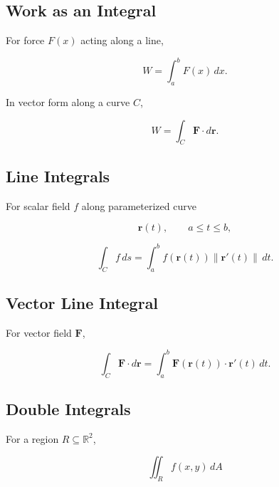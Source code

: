 \subsection{Work as an Integral}
\label{subsec:work-integral-reference}

For force \(F(x)\) acting along a line,

\[
\boxed{
W
=
\int_a^b
F(x)\,dx.
}
\]

In vector form along a curve \(C\),

\[
\boxed{
W
=
\int_C
\mathbf{F}\cdot d\mathbf{r}.
}
\]

\subsection{Line Integrals}
\label{subsec:line-integrals-reference}

For scalar field \(f\) along parameterized curve

\[
\mathbf{r}(t),
\qquad
a\leq t\leq b,
\]

\[
\boxed{
\int_C
f\,ds
=
\int_a^b
f(\mathbf{r}(t))
\|\mathbf{r}'(t)\|
\,dt.
}
\]

\subsection{Vector Line Integral}
\label{subsec:vector-line-integral-reference}

For vector field \(\mathbf{F}\),

\[
\boxed{
\int_C
\mathbf{F}\cdot d\mathbf{r}
=
\int_a^b
\mathbf{F}(\mathbf{r}(t))
\cdot
\mathbf{r}'(t)
\,dt.
}
\]

\subsection{Double Integrals}
\label{subsec:double-integral-reference}

For a region \(R\subseteq\mathbb{R}^2\),

\[
\boxed{
\iint_R
f(x,y)
\,dA
}
\]

